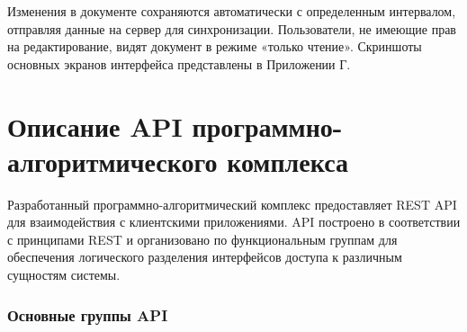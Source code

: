 Изменения в документе сохраняются автоматически с определенным интервалом, отправляя данные на сервер для синхронизации. Пользователи, не имеющие прав на редактирование, видят документ в режиме «только чтение».
Скриншоты основных экранов интерфейса представлены в Приложении Г.

\section{Описание API программно-алгоритмического комплекса}

Разработанный программно-алгоритмический комплекс предоставляет REST API для взаимодействия с клиентскими приложениями. 
API построено в соответствии с принципами REST и организовано по функциональным группам для обеспечения логического разделения интерфейсов доступа к различным сущностям системы.

\subsubsection{Основные группы API}

